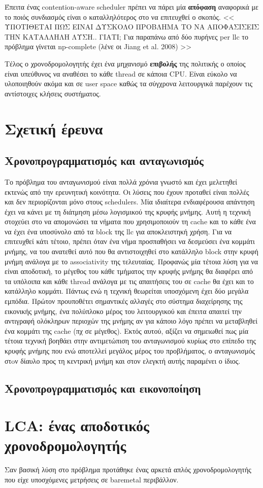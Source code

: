 Έπειτα ένας contention-aware scheduler πρέπει να πάρει μία \textbf{απόφαση}
αναφορικά με το ποιός συνδιασμός είναι ο καταλληλότερος στο να επιτευχθεί ο
σκοπός. << ΥΠΟΤΙΘΕΤΑΙ ΠΩΣ ΕΙΝΑΙ ΔΥΣΚΟΛΟ ΠΡΟΒΛΗΜΑ ΤΟ ΝΑ ΑΠΟΦΑΣΙΣΕΙΣ ΤΗΝ ΚΑΤΑΛΛΗΛΗ
ΛΥΣΗ.. ΓΙΑΤΙ; Για παραπάνω από δύο πυρήνες per llc το πρόβλημα γίνεται
np-complete (λένε οι Jiang et al. 2008) >>

Τέλος ο χρονοδρομολογητής έχει ένα μηχανισμό \textbf{επιβολής} της πολιτικής ο
οποίος είναι υπεύθυνος να αναθέσει το κάθε thread σε κάποια CPU. Είναι εύκολο να
υλοποιηθούν ακόμα και σε user space καθώς τα σύγχρονα λειτουργικά παρέχουν τις
αντίστοιχες κλήσεις συστήματος.

\section{Σχετική έρευνα}
\subsection{Χρονοπρογραμματισμός και ανταγωνισμός}
Το πρόβλημα του ανταγωνισμού είναι πολλά χρόνια γνωστό και έχει μελετηθεί
εκτενώς από την ερευνητική κοινότητα. Οι λύσεις που έχουν προταθεί είναι πολλές
και δεν περιορίζονται μόνο στους schedulers. Μία ιδιαίτερα ενδιαφέρουσα απάντηση
έχει να κάνει με τη διάτμηση μέσω λογισμικού της κρυφής μνήμης. Αυτή η τεχνική
στοχεύει στο να απομονώσει τα νήματα που χρησιμοποιούν τη cache και το κάθε ένα
να έχει ένα υποσύνολο από τα block της llc για αποκλειστηκή χρήση. Για να
επιτευχθεί κάτι τέτοιο, πρέπει όταν ένα νήμα προσπαθήσει να δεσμεύσει ένα
κομμάτι μνήμης, να του ανατεθεί αυτό που θα αντιστοιχηθεί στο κατάλληλο block
στην κρυφή μνήμη ανάλογα με το associativity της τελευταίας. Προφανώς μία τέτοια
λύση για να είναι αποδοτική, το μέγεθος του κάθε τμήματος την κρυφής μνήμης θα
διαφέρει από τα υπόλοιπα και κάθε thread ανάλογα με τις απαιτήσεις του σε cache
θα έχει και το κατάλληλο κομμάτι. Πάντως ενώ η τεχνική θεωρείται υποσχόμενη έχει
δύο μεγάλα εμπόδια. Πρώτον προυποθέτει σημαντικές αλλαγές στο σύστημα
διαχείρησης της εικονικής μνήμης, ένα πολύπλοκο μέρος του λειτουργικού και
έπειτα απαιτεί την αντιγραφή ολόκληρων περιοχών της μνήμης αν για κάποιο λόγο
πρέπει να μεταβληθεί ένα κομμάτι της cache (πχ σε μέγεθος). Εκτός αυτού, αξίζει
να σημειωθεί πως μία τέτοια τεχνική βοηθάει στην αντιμετώπιση του ανταγωνισμού
κυρίως στο επίπεδο της κρυφής μνήμης που ενώ αποτελλεί μεγάλος μέρος του
προβλήματος, ο ανταγωνισμός στoν δίαυλο προς τη κεντρική μνήμη και στον ελεγκτή
αυτής παραμένει ο ίδιος.


\subsection{Χρονοπρογραμματισμός και εικονοποίηση}


\section{LCA: ένας αποδοτικός χρονοδρομολογητής}
Σαν βασική λύση στο πρόβλημα προτάθηκε ένας αρκετά απλός χρονοδρομολογητής που
είχε υποσχόμενες μετρήσεις σε baremetal περιβάλλον.
